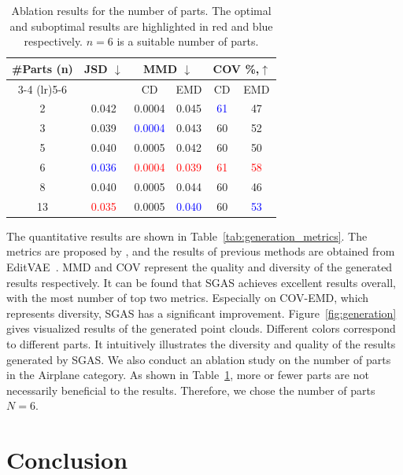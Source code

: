 \documentclass[letterpaper]{article} %
\begin{document}
\begin{table}[htb]
    \small
    \centering
    \caption{Ablation results for the number of parts. The optimal and suboptimal results are highlighted in red and blue respectively. $n=6$ is a suitable number of parts.}
    \label{tab:ablation_part_num}
    \begin{tabular}{c *5c}
        \toprule
        \multirow{2}{*}{\#Parts (n)} & \multirow{2}{*}{JSD $\downarrow$} & \multicolumn{2}{c}{MMD $\downarrow$} & \multicolumn{2}{c}{COV \%,$\uparrow$} \\
        \cmidrule(lr){3-4} \cmidrule(lr){5-6}
        & & CD & EMD & CD & EMD \\
        \midrule
        2  & 0.042 & 0.0004 & 0.045 & \textcolor{blue}{61} & 47 \\
        3  & 0.039 & \textcolor{blue}{0.0004} & 0.043	& 60 & 52 \\
        5  & 0.040 & 0.0005 & 0.042	& 60 & 50 \\
        6  & \textcolor{blue}{0.036} & \textcolor{red}{0.0004} & \textcolor{red}{0.039} & \textcolor{red}{61} & \textcolor{red}{58} \\
        8  & 0.040 & 0.0005 & 0.044	& 60 & 46 \\
        13 & \textcolor{red}{0.035} & 0.0005 & \textcolor{blue}{0.040} & 60 & \textcolor{blue}{53} \\
        \bottomrule
    \end{tabular}
\end{table}

The quantitative results are shown in Table~\ref{tab:generation_metrics}. The metrics are proposed by \citet{achlioptas2017latent_pc}, and the results of previous methods are obtained from EditVAE~\citep{Li_Liu_Walder_2022}. MMD and COV represent the quality and diversity of the generated results respectively. It can be found that SGAS achieves excellent results overall, with the most number of top two metrics. Especially on COV-EMD, which represents diversity, SGAS has a significant improvement. Figure~\ref{fig:generation} gives visualized results of the generated point clouds. Different colors correspond to different parts. It intuitively illustrates the diversity and quality of the results generated by SGAS. We also conduct an ablation study on the number of parts in the Airplane category. As shown in Table~\ref{tab:ablation_part_num}, more or fewer parts are not necessarily beneficial to the results. Therefore, we chose the number of parts $N=6$.


\section{Conclusion}
\end{document}
